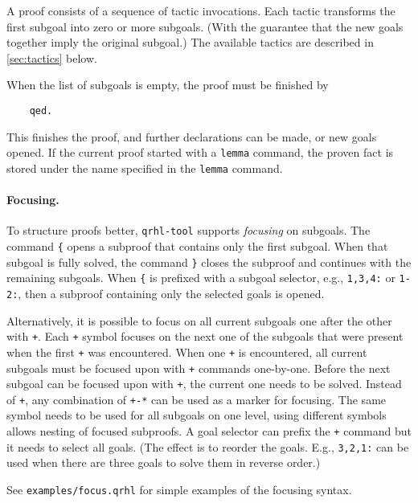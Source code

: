 \documentclass{article}
\makeatletter
\newcommand\toolidx[1]{\index{#1@\textttOLD{#1} (tool command)}}
\makeatother
\begin{document}
A proof consists of a sequence of tactic invocations. Each tactic
transforms the first subgoal into zero or more subgoals.  (With the
guarantee that the new goals together imply the original subgoal.)
The available tactics are described in \autoref{sec:tactics} below.

When the list of subgoals is empty, the proof must be finished by
\begin{center}
  \begin{lstlisting}
    qed.
  \end{lstlisting}
\end{center}
This finishes the proof, and further declarations can be made, or new
goals opened. If the current proof started with a \texttt{lemma}
command, the proven fact is stored under the name specified in the
\texttt{lemma} command.

\paragraph{Focusing.}
To structure proofs better, \texttt{qrhl-tool} supports \emph{focusing} on subgoals.
The command \texttt{\{}\toolidx{\{} opens a subproof that contains only the first subgoal.
When that subgoal is fully solved, the command \texttt{\}}\toolidx{\}} closes the subproof and continues with the remaining subgoals.
When \texttt{\{} is prefixed with a subgoal selector, e.g., \texttt{1,3,4:} or \texttt{1-2:}, then a subproof containing only the selected goals is opened.

Alternatively, it is possible to focus on all current subgoals one after the other with \texttt{+}.
Each \texttt{+} symbol focuses on the next one of the subgoals that were present when the first \texttt{+} was encountered.
When one \texttt{+} is encountered, all current subgoals must be focused upon with \texttt{+} commands one-by-one.
Before the next subgoal can be focused upon with \texttt{+}, the current one needs to be solved.
Instead of \texttt{+}, any combination of \texttt{+-*} can be used as a marker for focusing.
The same symbol needs to be used for all subgoals on one level, using different symbols allows nesting of focused subproofs.
A goal selector can prefix the \texttt{+} command but it needs to select all goals.
(The effect is to reorder the goals. E.g., \texttt{3,2,1:} can be used when there are three goals to solve them in reverse order.)

See \texttt{examples/focus.qrhl} for simple examples of the focusing syntax.
\end{document}
